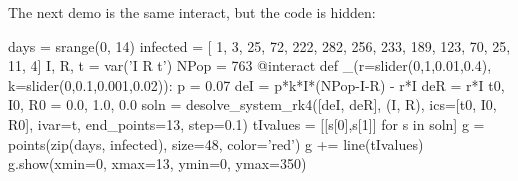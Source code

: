 \documentclass{ximera}
\begin{document}
The next demo is the same interact, but the code is hidden:

\begin{sageOutput}
days = srange(0, 14)
infected = [  1,   3,  25, 72, 222, 282, 256,
            233, 189, 123, 70,  25,  11,   4]
I, R, t = var('I R t')
NPop = 763
@interact
def _(r=slider(0,1,0.01,0.4),
      k=slider(0,0.1,0.001,0.02)):
    p = 0.07
    deI = p*k*I*(NPop-I-R) - r*I
    deR = r*I
    t0, I0, R0 = 0.0, 1.0, 0.0
    soln = desolve_system_rk4([deI, deR], (I, R),
                               ics=[t0, I0, R0], ivar=t,
                               end_points=13, step=0.1)
    tIvalues = [[s[0],s[1]] for s in soln]
    g = points(zip(days, infected), size=48, color='red')
    g += line(tIvalues)
    g.show(xmin=0, xmax=13, ymin=0, ymax=350)
\end{sageOutput}
\end{document}
